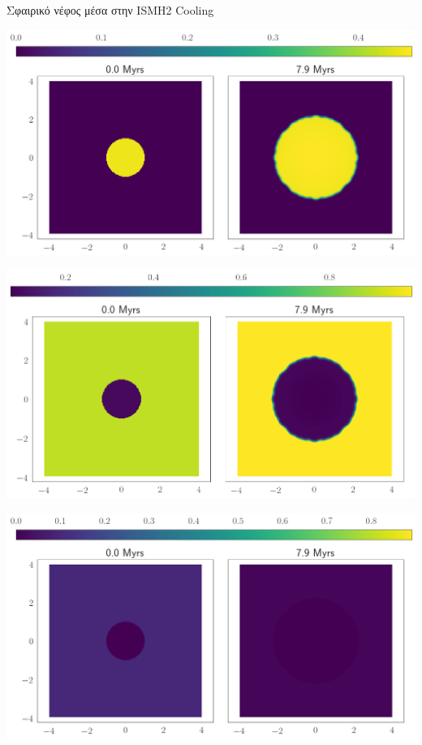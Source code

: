 \documentclass{beamer}
\begin{document}
\begin{frame}{Σφαιρικό νέφος μέσα στην ISM}{Η2 Cooling}
	\begin{center}
		\includegraphics[height=0.25\textheight]{../Document/DataImages/H2CoolingH2quad}
	\end{center}
	\begin{center}
		\includegraphics[height=0.25\textheight]{../Document/DataImages/H2CoolingHIquad}
	\end{center}
	\begin{center}
		\includegraphics[height=0.25\textheight]{../Document/DataImages/H2CoolingHIIquad}
	\end{center}
\end{frame}
\end{document}
